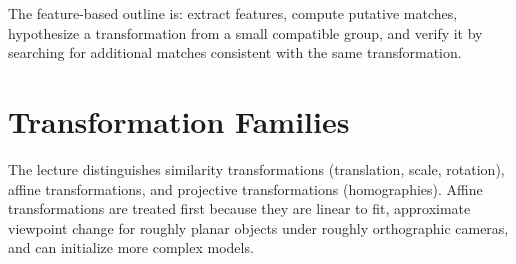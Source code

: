 \documentclass[11pt,a4paper,oneside]{report}
\begin{document}
The feature-based outline is: extract features, compute putative matches, hypothesize a transformation from a small compatible group, and verify it by searching for additional matches consistent with the same transformation.

\section{Transformation Families}

The lecture distinguishes similarity transformations (translation, scale, rotation), affine transformations, and projective transformations (homographies). Affine transformations are treated first because they are linear to fit, approximate viewpoint change for roughly planar objects under roughly orthographic cameras, and can initialize more complex models.
\end{document}
